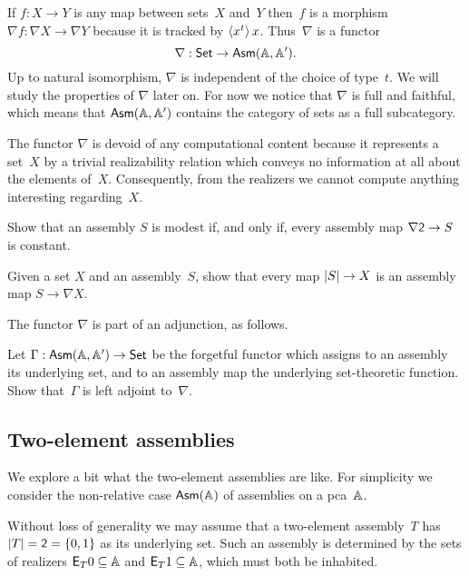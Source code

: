 If $f : X \to Y$ is any map between sets~$X$ and~$Y$ then~$f$ is a morphism $\nabla f : \nabla X \to \nabla Y$ because it is tracked by $\tpcalam{x}{t}{x}$. Thus~$\nabla$ is a functor
%
\begin{equation*}
  \nabla : \Set \to \AsmA.
\end{equation*}
%
Up to natural isomorphism, $\nabla$ is independent of the choice of
type~$t$. We will study the properties of $\nabla$ later on. For now
we notice that $\nabla$ is full and faithful, which means that
$\AsmA$ contains the category of sets as a full
subcategory.

The functor $\nabla$ is devoid of any computational content because it
represents a set~$X$ by a trivial realizability relation which conveys
no information at all about the elements of~$X$. Consequently, from
the realizers we cannot compute anything interesting regarding~$X$.

\begin{exercise}
  Show that an assembly $S$ is modest if, and only if, every assembly map $\nabla \two \to S$ is constant.
\end{exercise}

\begin{exercise}
  Given a set $X$ and an assembly~$S$, show that every map $\S{S} \to X$ is an assembly map $S \to \nabla X$.
\end{exercise}

The functor $\nabla$ is part of an adjunction, as follows.

\begin{exercise}
  Let $\Gamma : \AsmA \to \Set$ be the forgetful functor which assigns to an assembly its underlying set, and to an
  assembly map the underlying set-theoretic function. Show that~$\Gamma$ is left adjoint to~$\nabla$.
\end{exercise}


\subsection{Two-element assemblies}
\label{sec:two-elem-asm}

We explore a bit what the two-element assemblies are like. For simplicity we consider the non-relative case $\Asm{\AA}$ of assemblies on a pca~$\AA$.

Without loss of generality we may assume that a two-element assembly~$T$ has $\S{T} = \two = \{0, 1\}$ as its underlying set. Such an assembly is determined by the sets of realizers $\Ex{T} 0 \subseteq \AA$ and $\Ex{T} 1 \subseteq \AA$, which must both be inhabited.

